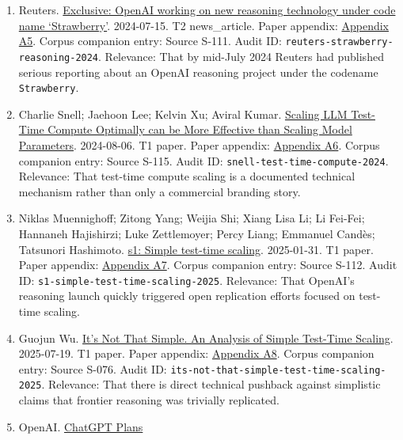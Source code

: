 \documentclass[
  american,
  11pt,
  letterpaper,
]{article}
\begin{document}
\begin{enumerate}
  board crisis to a letter about an AI breakthrough.
\item
  Reuters.
  \href{https://www.reuters.com/technology/artificial-intelligence/openai-working-new-reasoning-technology-under-code-name-strawberry-2024-07-12/}{Exclusive:
  OpenAI working on new reasoning technology under code name
  `Strawberry'}. 2024-07-15. T2 news\_article. Paper appendix:
  \hyperref[appendix-a5-exclusive-openai-working-on-new-reasoning-technology-under-code-name-strawberry]{Appendix
  A5}. Corpus companion entry: Source S-111. Audit ID:
  \texttt{reuters-strawberry-reasoning-2024}. Relevance: That by
  mid-July 2024 Reuters had published serious reporting about an OpenAI
  reasoning project under the codename \texttt{Strawberry}.
\item
  Charlie Snell; Jaehoon Lee; Kelvin Xu; Aviral Kumar.
  \href{https://arxiv.org/abs/2408.03314}{Scaling LLM Test-Time Compute
  Optimally can be More Effective than Scaling Model Parameters}.
  2024-08-06. T1 paper. Paper appendix:
  \hyperref[appendix-a6-scaling-llm-test-time-compute-optimally-can-be-more-effective-than-scaling-model-parameters]{Appendix
  A6}. Corpus companion entry: Source S-115. Audit ID:
  \texttt{snell-test-time-compute-2024}. Relevance: That test-time
  compute scaling is a documented technical mechanism rather than only a
  commercial branding story.
\item
  Niklas Muennighoff; Zitong Yang; Weijia Shi; Xiang Lisa Li; Li
  Fei-Fei; Hannaneh Hajishirzi; Luke Zettlemoyer; Percy Liang; Emmanuel
  Candès; Tatsunori Hashimoto.
  \href{https://arxiv.org/abs/2501.19393}{s1: Simple test-time scaling}.
  2025-01-31. T1 paper. Paper appendix:
  \hyperref[appendix-a7-s1-simple-test-time-scaling]{Appendix A7}.
  Corpus companion entry: Source S-112. Audit ID:
  \texttt{s1-simple-test-time-scaling-2025}. Relevance: That OpenAI's
  reasoning launch quickly triggered open replication efforts focused on
  test-time scaling.
\item
  Guojun Wu. \href{https://arxiv.org/abs/2507.14419}{It's Not That
  Simple. An Analysis of Simple Test-Time Scaling}. 2025-07-19. T1
  paper. Paper appendix:
  \hyperref[appendix-a8-it-s-not-that-simple-an-analysis-of-simple-test-time-scaling]{Appendix
  A8}. Corpus companion entry: Source S-076. Audit ID:
  \texttt{its-not-that-simple-test-time-scaling-2025}. Relevance: That
  there is direct technical pushback against simplistic claims that
  frontier reasoning was trivially replicated.
\item
  OpenAI. \href{https://chatgpt.com/pricing/}{ChatGPT Plans \textbar{}
}
\end{enumerate}
\end{document}
